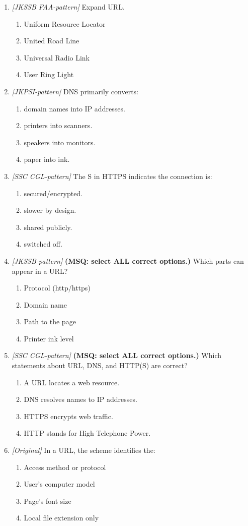 \begin{enumerate}[label=\textbf{Q\arabic*.}, leftmargin=*]
\item \textit{[JKSSB FAA-pattern]} Expand URL.
  \begin{enumerate}[label=\Alph*.]
    \item Uniform Resource Locator
    \item United Road Line
    \item Universal Radio Link
    \item User Ring Light
  \end{enumerate}
\item \textit{[JKPSI-pattern]} DNS primarily converts:
  \begin{enumerate}[label=\Alph*.]
    \item domain names into IP addresses.
    \item printers into scanners.
    \item speakers into monitors.
    \item paper into ink.
  \end{enumerate}
\item \textit{[SSC CGL-pattern]} The S in HTTPS indicates the connection is:
  \begin{enumerate}[label=\Alph*.]
    \item secured/encrypted.
    \item slower by design.
    \item shared publicly.
    \item switched off.
  \end{enumerate}
\item \textit{[JKSSB-pattern]} \textbf{(MSQ: select ALL correct options.)} Which parts can appear in a URL?
  \begin{enumerate}[label=\Alph*.]
    \item Protocol (http/https)
    \item Domain name
    \item Path to the page
    \item Printer ink level
  \end{enumerate}
\item \textit{[SSC CGL-pattern]} \textbf{(MSQ: select ALL correct options.)} Which statements about URL, DNS, and HTTP(S) are correct?
  \begin{enumerate}[label=\Alph*.]
    \item A URL locates a web resource.
    \item DNS resolves names to IP addresses.
    \item HTTPS encrypts web traffic.
    \item HTTP stands for High Telephone Power.
  \end{enumerate}
\item \textit{[Original]} In a URL, the scheme identifies the:
  \begin{enumerate}[label=\Alph*.]
\item Access method or protocol
   \item User's computer model
   \item Page's font size
   \item Local file extension only
  \end{enumerate}


\end{enumerate}
